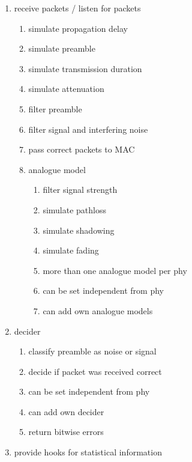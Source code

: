 \begin{enumerate}
\begin{enumerate}
	\end{enumerate}
 \item receive packets / listen for packets
		\begin{enumerate}
		\item simulate propagation delay \label{rcvSimDelay}
		\item simulate preamble \label{rcvSimPreamble}
		\item simulate transmission duration \label{rcvSimDuration}
		\item simulate attenuation \label{rcvSimAttenuation}
		\item filter preamble \label{rcvFilterPreamble}
		\item filter signal and interfering noise \label{rcvFilterSignals}
		\item pass correct packets to MAC \label{rcvPassToMAC}
		\item analogue model
			\begin{enumerate}
			\item filter signal strength \label{analogueFilter}
			\item simulate pathloss \label{analogueSimPathloss}
			\item simulate shadowing \label{analogueSimShadowing}
			\item simulate fading \label{analogueSimFading}
			\item more than one analogue model per phy \label{analogueMulti}
			\item can be set independent from phy \label{analogueIndependent}
			\item can add own analogue models \label{analogueExtensible}
			\end{enumerate}
		\end{enumerate}
		\item decider
			\begin{enumerate}
			\item classify preamble as noise or signal \label{rcvClassify}
			\item decide if packet was received correct \label{rcvIsCorrect}
			\item can be set independent from phy \label{deciderIndependent}
			\item can add own decider \label{deciderExtensible}
			\item return bitwise errors \label{deciderBitwise}
			\end{enumerate}
 \item provide hooks for statistical information
	\begin{enumerate}

\end{enumerate}
\end{enumerate}
